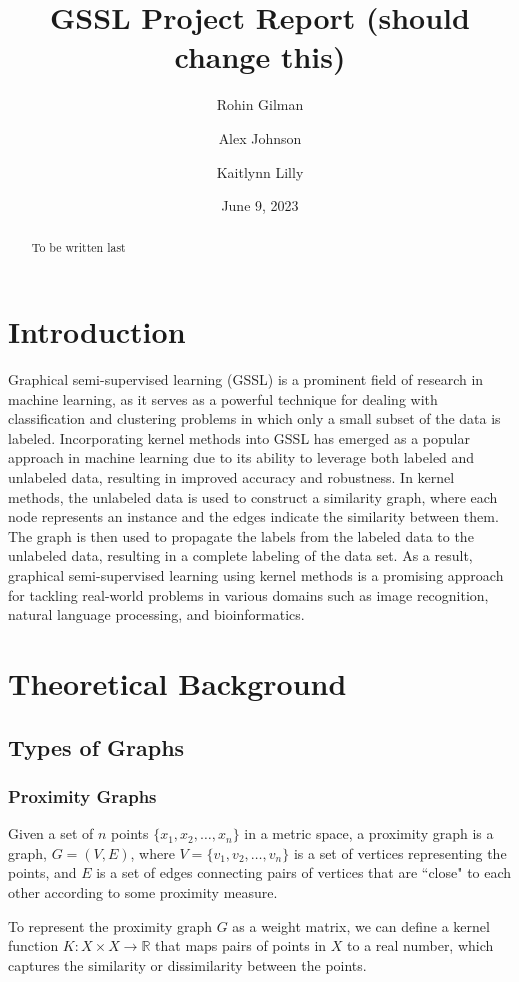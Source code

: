 \documentclass[12pt]{amsart}
\title{GSSL Project Report (should change this)}
\author{Rohin Gilman \and Alex Johnson \and Kaitlynn Lilly}
\date{June 9, 2023}
\begin{document}
\maketitle

\begin{abstract}
To be written last
\end{abstract}


\section{Introduction} 
Graphical semi-supervised learning (GSSL) is a prominent field of research in machine learning, as it serves as a powerful technique for dealing with classification and clustering problems in which only a small subset of the data is labeled. Incorporating kernel methods into GSSL has emerged as a popular approach in machine learning due to its ability to leverage both labeled and unlabeled data, resulting in improved accuracy and robustness. In kernel methods, the unlabeled data is used to construct a similarity graph, where each node represents an instance and the edges indicate the similarity between them. The graph is then used to propagate the labels from the labeled data to the unlabeled data, resulting in a complete labeling of the data set. As a result, graphical semi-supervised learning using kernel methods is a promising approach for tackling real-world problems in various domains such as image recognition, natural language processing, and bioinformatics.

\section{Theoretical Background}

\subsection{Types of Graphs}
\subsubsection{Proximity Graphs}
Given a set of $n$ points $\{x_1, x_2, \dots, x_n\}$ in a metric space, a proximity graph is a graph, $G = (V, E)$, where $V = \{v_1, v_2, \dots, v_n\}$ is a set of vertices representing the points, and $E$ is a set of edges connecting pairs of vertices that are ``close" to each other according to some proximity measure.

To represent the proximity graph $G$ as a weight matrix, we can define a kernel function $K: X \times X \rightarrow \mathbb{R}$ that maps pairs of points in $X$ to a real number, which captures the similarity or dissimilarity between the points. 
\end{document}
